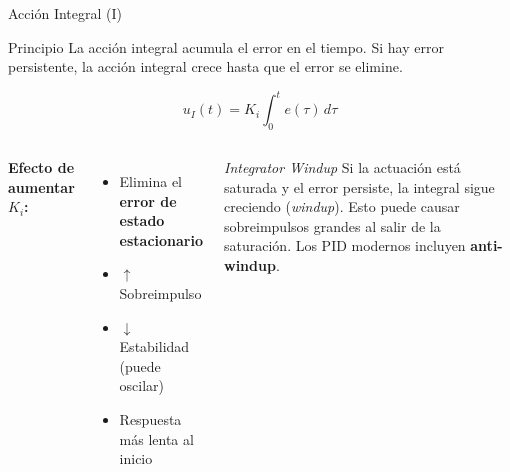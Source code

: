 \documentclass[aspectratio=169,xcolor=dvipsnames]{beamer}
\begin{document}
\begin{frame}{Acción Integral (I)}
    \footnotesize
    \begin{block}{Principio}
        La acción integral acumula el error en el tiempo. Si hay error persistente, la acción integral crece hasta que el error se elimine.
    \end{block}
    \begin{equation}
        u_I(t) = K_i \int_0^t e(\tau)\,d\tau
    \end{equation}
    \begin{columns}
        \textbf{Efecto de aumentar $K_i$:}
        \begin{itemize}
            \item Elimina el \textbf{error de estado estacionario}
            \item $\uparrow$ Sobreimpulso
            \item $\downarrow$ Estabilidad (puede oscilar)
            \item Respuesta más lenta al inicio
        \end{itemize}
        \begin{alertblock}{\textit{Integrator Windup}}
            Si la actuación está saturada y el error persiste, la integral sigue creciendo (\textit{windup}). Esto puede causar sobreimpulsos grandes al salir de la saturación. Los PID modernos incluyen \textbf{anti-windup}.
        \end{alertblock}
    \end{columns}
\end{frame}
\end{document}
